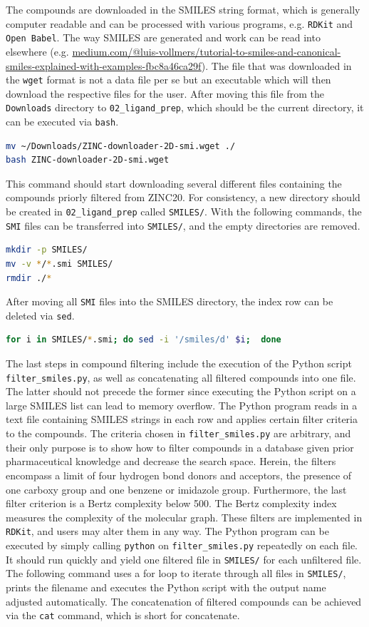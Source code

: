 \documentclass[9pt,tutorial]{livecoms}
\newcommand{\code}[1]{\colorbox{light-gray}{\texttt{#1}}}
\begin{document}
The compounds are downloaded in the SMILES string format, which is generally computer readable and can be processed with various programs, e.g. \texttt{RDKit} and \texttt{Open Babel}. The way SMILES are generated and work can be read into elsewhere (e.g. \url{medium.com/@luis-vollmers/tutorial-to-smiles-and-canonical-smiles-explained-with-examples-fbc8a46ca29f}). The file that was downloaded in the \texttt{wget} format is not a data file per se but an executable which will then download the respective files for the user. After moving this file from the \texttt{Downloads} directory to \code{02\_ligand\_prep}, which should be the current directory, it can be executed via \code{bash}.
\begin{lstlisting}[language=bash]
mv ~/Downloads/ZINC-downloader-2D-smi.wget ./
bash ZINC-downloader-2D-smi.wget
\end{lstlisting}
This command should start downloading several different files containing the compounds priorly filtered from ZINC20. For consistency, a new directory should be created in \code{02\_ligand\_prep} called \code{SMILES/}. With the following commands, the \texttt{SMI} files can be transferred into \code{SMILES/}, and the empty directories are removed.
\begin{lstlisting}[language=bash]
mkdir -p SMILES/
mv -v */*.smi SMILES/
rmdir ./*
\end{lstlisting}
After moving all \texttt{SMI} files into the SMILES directory, the index row can be deleted via \code{sed}.
\begin{lstlisting}[language=bash]
for i in SMILES/*.smi; do sed -i '/smiles/d' $i;  done
\end{lstlisting}
The last steps in compound filtering include the execution of the Python script \code{filter\_smiles.py}, as well as concatenating all filtered compounds into one file. The latter should not precede the former since executing the Python script on a large SMILES list can lead to memory overflow. The Python program reads in a text file containing SMILES strings in each row and applies certain filter criteria to the compounds. The criteria chosen in \code{filter\_smiles.py} are arbitrary, and their only purpose is to show how to filter compounds in a database given prior pharmaceutical knowledge and decrease the search space. Herein, the filters encompass a limit of four hydrogen bond donors and acceptors, the presence of one carboxy group and one benzene or imidazole group. Furthermore, the last filter criterion is a Bertz complexity below 500. The Bertz complexity index measures the complexity of the molecular graph. These filters are implemented in \texttt{RDKit}, and users may alter them in any way. The Python program can be executed by simply calling \code{python} on \code{filter\_smiles.py} repeatedly on each file. It should run quickly and yield one filtered file in \code{SMILES/} for each unfiltered file. The following command uses a for loop to iterate through all files in \code{SMILES/}, prints the filename and executes the Python script with the output name adjusted automatically. The concatenation of filtered compounds can be achieved via the \code{cat} command, which is short for concatenate.
\end{document}
